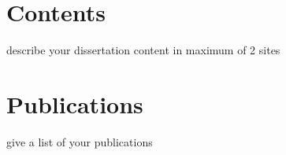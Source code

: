 \documentclass[de,summary]{template/rrlab} %
\begin{document}

\RRLABtitlepage{}{\currentdate\today}

\section*{Contents}
describe your dissertation content in maximum of 2 sites

\section*{Publications}
give a list of your publications 


\RRLABdeclaration{\currentdate\today}









\end{document}
